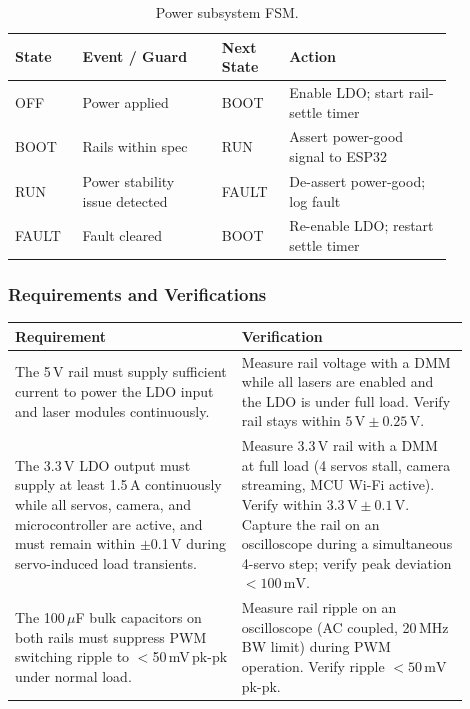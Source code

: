 \documentclass[12pt]{extarticle}
\begin{document}
\begin{table}[H]
\small\centering
\begin{tabular}{>{\raggedright}p{0.13\linewidth}
                >{\raggedright}p{0.28\linewidth}
                >{\raggedright}p{0.13\linewidth}
                >{\raggedright\arraybackslash}p{0.33\linewidth}}
\toprule
\textbf{State} & \textbf{Event / Guard} & \textbf{Next State} & \textbf{Action} \\
\midrule
OFF   & Power applied                  & BOOT  & Enable LDO; start rail-settle timer \\
BOOT  & Rails within spec              & RUN   & Assert power-good signal to ESP32 \\
RUN   & Power stability issue detected & FAULT & De-assert power-good; log fault \\
FAULT & Fault cleared                  & BOOT  & Re-enable LDO; restart settle timer \\
\bottomrule
\end{tabular}
\caption{Power subsystem FSM.}
\label{tab:fsm-power}
\end{table}

\subsubsection{Requirements and Verifications}

\begin{longtable}{>{\raggedright\arraybackslash}p{0.45\linewidth}
                  >{\raggedright\arraybackslash}p{0.45\linewidth}}
\toprule
\textbf{Requirement} & \textbf{Verification} \\
\midrule
\endhead
\bottomrule
\endfoot


The 5\,V rail must supply sufficient current to power the LDO input and laser modules
continuously. &
Measure rail voltage with a DMM while all lasers are enabled and the LDO is under full load.
Verify rail stays within $5\,\text{V} \pm 0.25\,\text{V}$. \\
\addlinespace

The 3.3\,V LDO output must supply at least 1.5\,A continuously while all servos, camera, and
microcontroller are active, and must remain within $\pm$0.1\,V during servo-induced load
transients. &
Measure 3.3\,V rail with a DMM at full load (4 servos stall, camera streaming, MCU Wi-Fi
active). Verify within $3.3\,\text{V} \pm 0.1\,\text{V}$. Capture the rail on an
oscilloscope during a simultaneous 4-servo step; verify peak deviation $<100\,\text{mV}$. \\
\addlinespace


The 100\,$\mu$F bulk capacitors on both rails must suppress PWM switching ripple to
$<$50\,mV\,pk-pk under normal load. &
Measure rail ripple on an oscilloscope (AC coupled, 20\,MHz BW limit) during PWM operation.
Verify ripple $<50\,\text{mV}$\,pk-pk. \\
\end{longtable}
\end{document}
